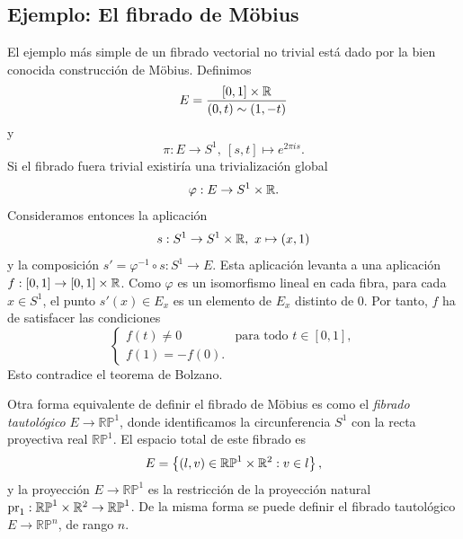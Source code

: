 \documentclass[11pt,a4paper]{amsbook}
\theoremstyle{remark} \newtheorem{rmk}[subsection]{Observación}
\theoremstyle{definition} \newtheorem{defn}[subsection]{Definición}
\theoremstyle{definition} \newtheorem{ex}[subsection]{Ejemplo}
\theoremstyle{definition} \newtheorem{ej}[subsection]{Ejercicio}
\begin{document}
\subsection{Ejemplo: El fibrado de Möbius} El ejemplo más simple de un fibrado vectorial no trivial está dado por la bien conocida construcción de Möbius. Definimos
\begin{equation*}
E = \frac{[0,1]\times \mathbb R}{(0,t)\sim (1,-t)}
\end{equation*}
y
\begin{equation*}
\pi:E \rightarrow S^1,\ [s,t] \mapsto e^{2\pi i s}.
\end{equation*}
Si el fibrado fuera trivial existiría una trivialización global
\begin{equation*}
\varphi: E \rightarrow S^1 \times \mathbb R.
\end{equation*}
Consideramos entonces la aplicación
\begin{equation*}
s: S^1\rightarrow S^1\times \mathbb R,\ x \mapsto (x,1)
\end{equation*}
y la composición $s'=\varphi^{-1}\circ s: S^1 \rightarrow E$. Esta aplicación levanta a una aplicación $f:[0,1]\rightarrow [0,1] \times \mathbb R$. Como $\varphi$ es un isomorfismo lineal en cada fibra, para cada $x\in S^1$, el punto $s'(x)\in E_x$ es un elemento de $E_x$ distinto de $0$. Por tanto, $f$ ha de satisfacer las condiciones
\begin{equation*}
\begin{cases}
f(t)\neq 0 & \text{para todo } t \in [0,1], \\
f(1) = -f(0).
\end{cases}
\end{equation*}
Esto contradice el teorema de Bolzano.

Otra forma equivalente de definir el fibrado de Möbius es como el \emph{fibrado tautológico} $E\rightarrow \mathbb{RP}^1$, donde identificamos la circunferencia $S^1$ con la recta proyectiva real $\mathbb{RP}^1$. El espacio total de este fibrado es
\begin{equation*}
E = \left\{ (l,v) \in \mathbb{RP}^1 \times \mathbb R^2 : v\in l \right\},
\end{equation*}
y la proyección $E\rightarrow \mathbb{RP}^1$ es la restricción de la proyección natural $\mathrm{pr}_1:\mathbb{RP}^1 \times \mathbb R^2\rightarrow \mathbb{RP}^1$. De la misma forma se puede definir el fibrado tautológico $E\rightarrow \mathbb{RP}^n$, de rango $n$.
\end{document}
